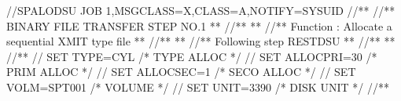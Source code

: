 \documentclass[letterpaper,10pt,english]{sphinxmanual}
\begin{document}
\begin{sphinxVerbatim}[commandchars=\\\{\}]
//SPALODSU JOB 1,MSGCLASS=X,CLASS=A,NOTIFY=\PYGZam{}SYSUID
//*\PYGZhy{}\PYGZhy{}\PYGZhy{}\PYGZhy{}\PYGZhy{}\PYGZhy{}\PYGZhy{}\PYGZhy{}\PYGZhy{}\PYGZhy{}\PYGZhy{}\PYGZhy{}\PYGZhy{}\PYGZhy{}\PYGZhy{}\PYGZhy{}\PYGZhy{}\PYGZhy{}\PYGZhy{}\PYGZhy{}\PYGZhy{}\PYGZhy{}\PYGZhy{}\PYGZhy{}\PYGZhy{}\PYGZhy{}\PYGZhy{}\PYGZhy{}\PYGZhy{}\PYGZhy{}\PYGZhy{}\PYGZhy{}\PYGZhy{}\PYGZhy{}\PYGZhy{}\PYGZhy{}\PYGZhy{}\PYGZhy{}\PYGZhy{}\PYGZhy{}\PYGZhy{}\PYGZhy{}\PYGZhy{}\PYGZhy{}\PYGZhy{}\PYGZhy{}\PYGZhy{}\PYGZhy{}\PYGZhy{}\PYGZhy{}\PYGZhy{}\PYGZhy{}\PYGZhy{}\PYGZhy{}\PYGZhy{}\PYGZhy{}\PYGZhy{}\PYGZhy{}\PYGZhy{}\PYGZhy{}\PYGZhy{}\PYGZhy{}\PYGZhy{}\PYGZhy{}\PYGZhy{}\PYGZhy{}\PYGZhy{}*
//*\PYGZhy{}\PYGZhy{}* BINARY FILE TRANSFER \PYGZhy{} STEP NO.1                            *\PYGZhy{}\PYGZhy{}*
//*\PYGZhy{}\PYGZhy{}*                                                             *\PYGZhy{}\PYGZhy{}*
//*\PYGZhy{}\PYGZhy{}* Function : Allocate a sequential XMIT type file             *\PYGZhy{}\PYGZhy{}*
//*\PYGZhy{}\PYGZhy{}*                                                             *\PYGZhy{}\PYGZhy{}*
//*\PYGZhy{}\PYGZhy{}* Following step \PYGZdl{}RESTDSU                                     *\PYGZhy{}\PYGZhy{}*
//*\PYGZhy{}\PYGZhy{}*                                                             *\PYGZhy{}\PYGZhy{}*
//*\PYGZhy{}\PYGZhy{}\PYGZhy{}\PYGZhy{}\PYGZhy{}\PYGZhy{}\PYGZhy{}\PYGZhy{}\PYGZhy{}\PYGZhy{}\PYGZhy{}\PYGZhy{}\PYGZhy{}\PYGZhy{}\PYGZhy{}\PYGZhy{}\PYGZhy{}\PYGZhy{}\PYGZhy{}\PYGZhy{}\PYGZhy{}\PYGZhy{}\PYGZhy{}\PYGZhy{}\PYGZhy{}\PYGZhy{}\PYGZhy{}\PYGZhy{}\PYGZhy{}\PYGZhy{}\PYGZhy{}\PYGZhy{}\PYGZhy{}\PYGZhy{}\PYGZhy{}\PYGZhy{}\PYGZhy{}\PYGZhy{}\PYGZhy{}\PYGZhy{}\PYGZhy{}\PYGZhy{}\PYGZhy{}\PYGZhy{}\PYGZhy{}\PYGZhy{}\PYGZhy{}\PYGZhy{}\PYGZhy{}\PYGZhy{}\PYGZhy{}\PYGZhy{}\PYGZhy{}\PYGZhy{}\PYGZhy{}\PYGZhy{}\PYGZhy{}\PYGZhy{}\PYGZhy{}\PYGZhy{}\PYGZhy{}\PYGZhy{}\PYGZhy{}\PYGZhy{}\PYGZhy{}\PYGZhy{}\PYGZhy{}*
// SET TYPE=CYL                                        /* TYPE ALLOC */
// SET ALLOCPRI=30                                     /* PRIM ALLOC */
// SET ALLOCSEC=1                                      /* SECO ALLOC */
// SET VOLM=SPT001                                         /* VOLUME */
// SET UNIT=3390                                        /* DISK UNIT */
//*\PYGZhy{}\PYGZhy{}\PYGZhy{}\PYGZhy{}\PYGZhy{}\PYGZhy{}\PYGZhy{}\PYGZhy{}\PYGZhy{}\PYGZhy{}\PYGZhy{}\PYGZhy{}\PYGZhy{}\PYGZhy{}\PYGZhy{}\PYGZhy{}\PYGZhy{}\PYGZhy{}\PYGZhy{}\PYGZhy{}\PYGZhy{}\PYGZhy{}\PYGZhy{}\PYGZhy{}\PYGZhy{}\PYGZhy{}\PYGZhy{}\PYGZhy{}\PYGZhy{}\PYGZhy{}\PYGZhy{}\PYGZhy{}\PYGZhy{}\PYGZhy{}\PYGZhy{}\PYGZhy{}\PYGZhy{}\PYGZhy{}\PYGZhy{}\PYGZhy{}\PYGZhy{}\PYGZhy{}\PYGZhy{}\PYGZhy{}\PYGZhy{}\PYGZhy{}\PYGZhy{}\PYGZhy{}\PYGZhy{}\PYGZhy{}\PYGZhy{}\PYGZhy{}\PYGZhy{}\PYGZhy{}\PYGZhy{}\PYGZhy{}\PYGZhy{}\PYGZhy{}\PYGZhy{}\PYGZhy{}\PYGZhy{}\PYGZhy{}\PYGZhy{}\PYGZhy{}\PYGZhy{}\PYGZhy{}\PYGZhy{}*

\end{sphinxVerbatim}
\end{document}
